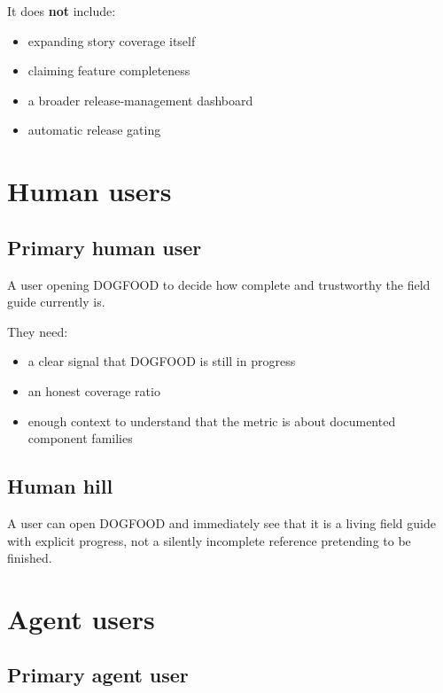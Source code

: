 It does \textbf{not} include:

\begin{itemize}
\tightlist
\item
  expanding story coverage itself
\item
  claiming feature completeness
\item
  a broader release-management dashboard
\item
  automatic release gating
\end{itemize}

\section{Human users}\label{record-064-human-users}

\subsection{Primary human user}\label{record-064-primary-human-user}

A user opening DOGFOOD to decide how complete and trustworthy the field guide currently is.

They need:

\begin{itemize}
\tightlist
\item
  a clear signal that DOGFOOD is still in progress
\item
  an honest coverage ratio
\item
  enough context to understand that the metric is about documented component families
\end{itemize}

\subsection{Human hill}\label{record-064-human-hill}

A user can open DOGFOOD and immediately see that it is a living field guide with explicit progress, not a silently incomplete reference pretending to be finished.

\section{Agent users}\label{record-064-agent-users}

\subsection{Primary agent user}\label{record-064-primary-agent-user}

